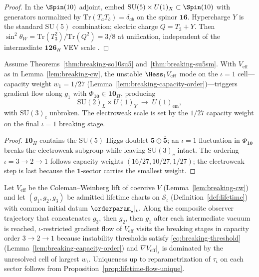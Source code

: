 \begin{proof}
In the $\Spin(10)$ adjoint, embed
$\mathrm{SU}(5)\times U(1)_X\subset\Spin(10)$ with generators normalized by
$\mathrm{Tr}(T_aT_b)=\delta_{ab}$ on the spinor $\mathbf{16}$. Hypercharge
$Y$ is the standard $\mathrm{SU}(5)$ combination; electric charge
$Q=T_3+Y$. Then
$\sin^2\theta_W=\mathrm{Tr}(T_3^2)/\mathrm{Tr}(Q^2)=3/8$ at unification,
independent of the intermediate $\mathbf{126}_H$ VEV scale
\cite{GeorgiGlashow1974,Witten1985}.
\end{proof}

\begin{theorem}\label{thm:breaking-ew}
Assume Theorems~\ref{thm:breaking-so10su5} and~\ref{thm:breaking-su5sm}.
With $V_{\mathrm{eff}}$ as in Lemma~\ref{lem:breaking-cw}, the unstable
$\Hess_1 V_{\mathrm{eff}}$ mode on the $\iota=1$ cell---capacity weight
$w_1=1/27$ (Lemma~\ref{lem:breaking-capacity-order})---triggers gradient flow
along $g_1$ with $\Phi_{\mathbf{10}}\in\mathbf{10}_H$, producing
\begin{equation}\label{eq:breaking-ew}
  \mathrm{SU}(2)_L\times U(1)_Y
  \;\longrightarrow\;
  U(1)_{\mathrm{em}},
\end{equation}
with $\mathrm{SU}(3)_c$ unbroken. The electroweak scale is set by the
$1/27$ capacity weight on the final $\iota=1$ breaking stage.
\end{theorem}

\begin{proof}
$\mathbf{10}_H$ contains the $\mathrm{SU}(5)$ Higgs doublet
$\mathbf{5}\oplus\overline{\mathbf{5}}$; an $\iota=1$ fluctuation in
$\Phi_{\mathbf{10}}$ breaks the electroweak subgroup while leaving
$\mathrm{SU}(3)_c$ intact. The ordering $\iota=3\to2\to1$ follows capacity
weights $(16/27,10/27,1/27)$; the electroweak step is last because the
$\mathbf{1}$-sector carries the smallest weight.
\end{proof}

\begin{proposition}
\label{prop:breaking-sequential}
Let $V_{\mathrm{eff}}$ be the Coleman--Weinberg lift of coercive $V$
(Lemma~\ref{lem:breaking-cw}) and let $(g_1,g_2,g_3)$ be admitted lifetime
charts on $\mathcal{S}_\iota$ (Definition~\ref{def:lifetime}) with common
initial datum $\orderparam_\star|_\iota$. Along the composite observer trajectory
that concatenates $g_3$, then $g_2$, then $g_1$ after each intermediate vacuum is
reached, $\iota$-restricted gradient flow of $V_{\mathrm{eff}}$ visits the
breaking stages in capacity order $3\to2\to1$ because instability thresholds
satisfy \eqref{eq:breaking-threshold} (Lemma~\ref{lem:breaking-capacity-order})
and $\nabla V_{\mathrm{eff}}|_\iota$ is dominated by the unresolved cell of
largest $w_\iota$. Uniqueness up to reparametrization of $\tau_\iota$ on each
sector follows from Proposition~\ref{prop:lifetime-flow-unique}.
\end{proposition}

